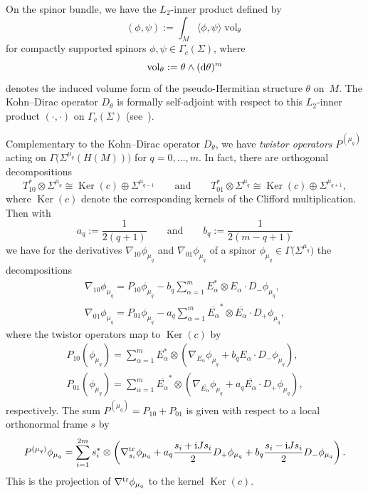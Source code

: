 \documentclass[10pt,a4paper]{amsart}
\numberwithin{equation}{section}
\begin{document}
On the spinor bundle, we have the $L_2$-inner product defined by
\[
(\phi,\psi) := \int_{M} \langle\phi,\psi\rangle \operatorname{vol}_\theta
\]
for compactly supported spinors $\phi,\psi\in\Gamma_c(\Sigma)$, where
\[
\operatorname{vol}_\theta := \theta\wedge ({\rm d}\theta)^m
\]
denotes the induced volume form of the pseudo-Hermitian structure $\theta$ on~$M$.
The Kohn--Dirac operator $D_\theta$ is formally self-adjoint with respect to this $L_2$-inner product $(\cdot,\cdot)$ on $\Gamma_c(\Sigma)$ (see~\cite{LeiN1}).

Complementary to the Kohn--Dirac operator $D_\theta$, we have {\em twistor operators} $P^{(\mu_q)}$ acting on $\Gamma\big(\Sigma^{\mu_q}(H(M))\big)$ for $q=0,\dots,m$.
In fact, there are orthogonal decompositions
\[
T_{10}^*\otimes \Sigma^{\mu_q} \cong \operatorname{Ker}(c)\oplus \Sigma^{\mu_{q-1}}\qquad\mbox{and}\qquad T_{01}^*\otimes \Sigma^{\mu_q} \cong \operatorname{Ker}(c)\oplus \Sigma^{\mu_{q+1}},
\]
where $\operatorname{Ker}(c)$ denote the corresponding kernels of the Clifford multiplication. Then
with
\[
a_q:= \frac{1}{2(q+1)}\qquad\mbox{and}\qquad b_q:=\frac{1}{2(m-q+1)}
\]
we have for the derivatives $\nabla_{10}\phi_{\mu_q}$ and $\nabla_{01}\phi_{\mu_q}$ of a spinor $\phi_{\mu_q}\in\Gamma\big(\Sigma^{\mu_q}\big)$ the decompositions
\begin{gather*}
\nabla_{10}\phi_{\mu_q} = P_{10}\phi_{\mu_q} - b_q\sum_{\alpha=1}^m E_\alpha^*\otimes E_\alpha\cdot D_-\phi_{\mu_q},\\
\nabla_{01}\phi_{\mu_q} = P_{01}\phi_{\mu_q} - a_q\sum_{\alpha=1}^m \overline{E_\alpha}^*\otimes \overline{E_\alpha}\cdot D_+\phi_{\mu_q},
\end{gather*}
where the twistor operators map to $\operatorname{Ker}(c)$ by
\begin{gather*}
P_{10}(\phi_{\mu_q}) = \sum_{\alpha=1}^m E_\alpha^*\otimes \left( \nabla_{E_\alpha}\phi_{\mu_q} + b_q E_\alpha\cdot D_-\phi_{\mu_q}\right),\\
P_{01}(\phi_{\mu_q}) = \sum_{\alpha=1}^m \overline{E_\alpha}^*\otimes \left( \nabla_{\overline{E_\alpha}}\phi_{\mu_q} +
a_q \overline{E_\alpha}\cdot D_+\phi_{\mu_q}\right),
\end{gather*}
respectively. The sum $P^{(\mu_q)}=P_{10}+P_{01}$ is given with respect to a local orthonormal
frame $s$ by
\[
P^{(\mu_q)}\phi_{\mu_q} = \sum_{i=1}^{2m} s_i^*\otimes\left( \nabla^{\rm tr}_{s_i}\phi_{\mu_q}+a_q\frac{s_i+{\rm i}Js_i}{2}D_+\phi_{\mu_q} +b_q\frac{s_i-{\rm i}Js_i}{2}D_-\phi_{\mu_q} \right).
\]
This is the projection of $\nabla^{\rm tr}\phi_{\mu_q}$ to the kernel $\operatorname{Ker}(c)$.
\end{document}
